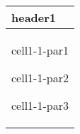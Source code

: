 \label{\detokenize{tabular:table-with-cell-in-first-column-having-three-paragraphs}}

\begin{savenotes}\sphinxattablestart
\centering
\begin{tabulary}{\linewidth}[t]{|T|}
\hline
\sphinxstyletheadfamily 
header1
\\
\hline
cell1-1-par1

cell1-1-par2

cell1-1-par3
\\
\hline
\end{tabulary}
\par
\sphinxattableend\end{savenotes}
